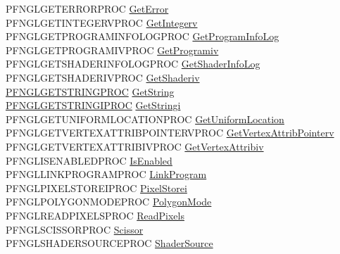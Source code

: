 \begin{DoxyCompactItemize}
\begin{tabbing}
\>PFNGLGETERRORPROC \hyperlink{unionGL3WProcs_a4e2cb52b854ef200ca3671ab14e60adf}{GetError}\\
\>PFNGLGETINTEGERVPROC \hyperlink{unionGL3WProcs_ae620958f5527f0dc49b414acce64cf93}{GetIntegerv}\\
\>PFNGLGETPROGRAMINFOLOGPROC \hyperlink{unionGL3WProcs_ac6030e7e729d02f606d899beb44f622a}{GetProgramInfoLog}\\
\>PFNGLGETPROGRAMIVPROC \hyperlink{unionGL3WProcs_a337c8d71098b49f4efe66e6d0a6fbeeb}{GetProgramiv}\\
\>PFNGLGETSHADERINFOLOGPROC \hyperlink{unionGL3WProcs_ab9f1406ea039132b79153b1cc78ec5bc}{GetShaderInfoLog}\\
\>PFNGLGETSHADERIVPROC \hyperlink{unionGL3WProcs_a853cde3f7eaf190fe7ab80fa65a9691e}{GetShaderiv}\\
\>\hyperlink{imgui__impl__opengl3__loader_8h_ada30dc3fccd01b4d8b4744092b7bc93f}{PFNGLGETSTRINGPROC} \hyperlink{unionGL3WProcs_a3e880d6e6e66fc2c3ddea786d1e1be3c}{GetString}\\
\>\hyperlink{imgui__impl__opengl3__loader_8h_a75bad8d467f959c6d5b724ed03c0d092}{PFNGLGETSTRINGIPROC} \hyperlink{unionGL3WProcs_a884f9d98a08bf16a7b84d7a19483ba2b}{GetStringi}\\
\>PFNGLGETUNIFORMLOCATIONPROC \hyperlink{unionGL3WProcs_a572bcb6d7a82b9466c85e3c85ca6e79d}{GetUniformLocation}\\
\>PFNGLGETVERTEXATTRIBPOINTERVPROC \hyperlink{unionGL3WProcs_ac041e41659596788dc75ab2efbee1612}{GetVertexAttribPointerv}\\
\>PFNGLGETVERTEXATTRIBIVPROC \hyperlink{unionGL3WProcs_a202bcb53f9d9007bb1a94e62ec6e591d}{GetVertexAttribiv}\\
\>PFNGLISENABLEDPROC \hyperlink{unionGL3WProcs_ac3d6d68f4def0fe5842707dd4fb5bc68}{IsEnabled}\\
\>PFNGLLINKPROGRAMPROC \hyperlink{unionGL3WProcs_ab2ac4332e7c954a9c8c661974bc46750}{LinkProgram}\\
\>PFNGLPIXELSTOREIPROC \hyperlink{unionGL3WProcs_ab650313cf63e8d77cf2f6b295f3ab95e}{PixelStorei}\\
\>PFNGLPOLYGONMODEPROC \hyperlink{unionGL3WProcs_a9a7bf767c62a9fa7206637538e8ecdb0}{PolygonMode}\\
\>PFNGLREADPIXELSPROC \hyperlink{unionGL3WProcs_a043a9f43deb82e71ef9955db4d0b8524}{ReadPixels}\\
\>PFNGLSCISSORPROC \hyperlink{unionGL3WProcs_a07a530d18695ae338e4c4da804572aa3}{Scissor}\\
\>PFNGLSHADERSOURCEPROC \hyperlink{unionGL3WProcs_a8be83ac93d1efc2727039c61d6e7b85f}{ShaderSource}\\

\end{tabbing}
\end{DoxyCompactItemize}
